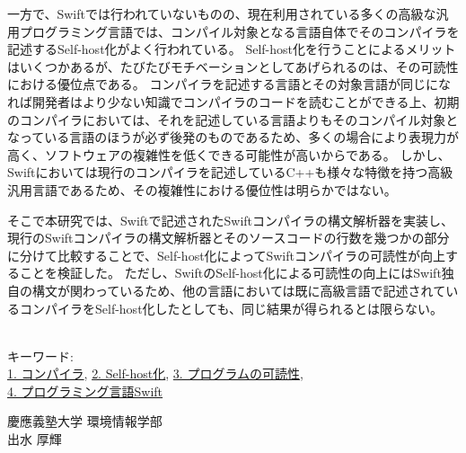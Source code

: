 一方で、Swiftでは行われていないものの、現在利用されている多くの高級な汎用プログラミング言語では、コンパイル対象となる言語自体でそのコンパイラを記述するSelf-host化がよく行われている。
Self-host化を行うことによるメリットはいくつかあるが、たびたびモチベーションとしてあげられるのは、その可読性における優位点である。
コンパイラを記述する言語とその対象言語が同じになれば開発者はより少ない知識でコンパイラのコードを読むことができる上、初期のコンパイラにおいては、それを記述している言語よりもそのコンパイル対象となっている言語のほうが必ず後発のものであるため、多くの場合により表現力が高く、ソフトウェアの複雑性を低くできる可能性が高いからである。
しかし、Swiftにおいては現行のコンパイラを記述しているC++も様々な特徴を持つ高級汎用言語であるため、その複雑性における優位性は明らかではない。

そこで本研究では、Swiftで記述されたSwiftコンパイラの構文解析器を実装し、現行のSwiftコンパイラの構文解析器とそのソースコードの行数を幾つかの部分に分けて比較することで、Self-host化によってSwiftコンパイラの可読性が向上することを検証した。
ただし、SwiftのSelf-host化による可読性の向上にはSwift独自の構文が関わっているため、他の言語においては既に高級言語で記述されているコンパイラをSelf-host化したとしても、同じ結果が得られるとは限らない。

~ \\
キーワード:\\
\underline{1. コンパイラ},
\underline{2. Self-host化},
\underline{3. プログラムの可読性},\\
\underline{4. プログラミング言語Swift}
\begin{flushright}
慶應義塾大学 環境情報学部\\
出水 厚輝
\end{flushright}
